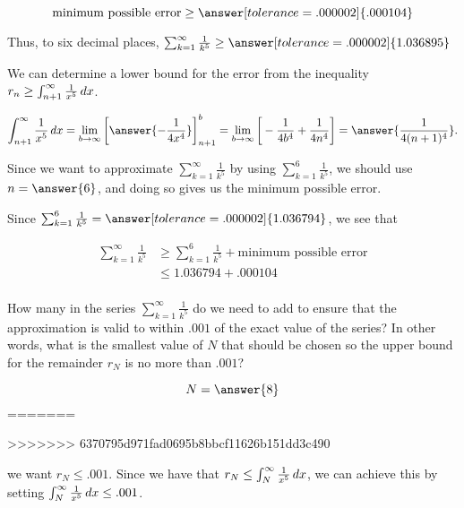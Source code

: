 \documentclass{ximera}
\begin{document}
\begin{exercise}
\begin{exercise}
\[
\textrm{minimum possible error} \geq \answer[tolerance=.000002]{.000104}
\]

Thus, to six decimal places, $\sum_{k=1}^{\infty} \frac{1}{k^5} \geq \answer[tolerance=.000002]{ 1.036895}$

\begin{hint}
We can determine a lower bound for the error from the inequality $ r_n \geq \int_{n+1}^{\infty} \frac{1}{x^5} \mathop{}\!d x$. 

\[
\int_{n+1}^\infty \frac{1}{x^5} \d x = \lim_{b \to \infty} \eval{\answer{-\frac{1}{4x^4}}}_{n+1}^b = \lim_{b \to \infty} \eval{-\frac{1}{4b^4}+\frac{1}{4n^4}} =\answer{\frac{1}{4(n+1)^4}}. 
\]

Since we want to approximate $\sum_{k=1}^{\infty} \frac{1}{k^5}$ by using $\sum_{k=1}^{6} \frac{1}{k^5}$, we should use $n=\answer{6}$, and doing so gives us the minimum possible error.

Since $\sum_{k=1}^{6} \frac{1}{k^5} = \answer[tolerance=.000002]{1.036794}$, we see that 

\begin{align*}
\sum_{k=1}^{\infty} \frac{1}{k^5} & \geq \sum_{k=1}^{6} \frac{1}{k^5} + \textrm{minimum possible error} \\
& \leq 1.036794 + .000104 \\
\end{align*}

\end{hint}
\end{exercise}


\begin{exercise}
How many in the series $\sum_{k=1}^{\infty} \frac{1}{k^5}$ do we need to add to ensure that the approximation is valid to within $.001$ of the exact value of the series?  In other words, what is the smallest value of $N$ that should be chosen so the upper bound for the remainder $r_N$ is no more than $.001$?

\[
N=\answer{8}
\]
=======
\begin{selectAll}
\end{selectAll}
>>>>>>> 6370795d971fad0695b8bbcf11626b151dd3c490

\begin{hint}
we want $r_N \leq .001$.  Since we have that $r_N \leq \int_{N}^{\infty} \frac{1}{x^5} \mathop{}\!d x$, we can achieve this by setting $\int_{N}^{\infty} \frac{1}{x^5} \mathop{}\!d x \leq .001$. 


\end{hint}
\end{exercise}
\end{exercise}
\end{document}
